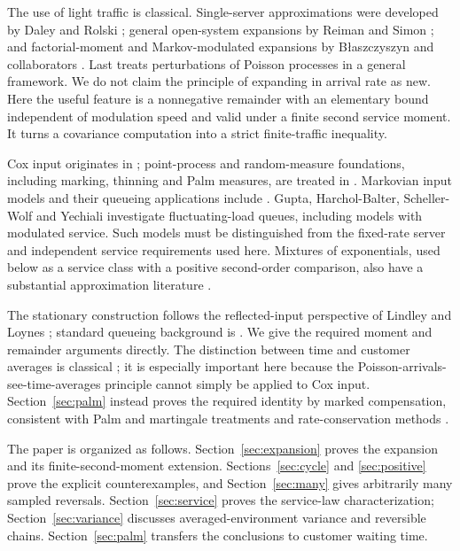 \documentclass[11pt,reqno]{amsart}
\numberwithin{equation}{section}
\theoremstyle{plain}
\theoremstyle{definition}
\newcommand{\1}{\mathbf 1}
\begin{document}
The use of light traffic is classical. Single-server approximations were developed by Daley and Rolski \cite{DR84,DR91,DR94}; general open-system expansions by Reiman and Simon \cite{RS89}; and factorial-moment and Markov-modulated expansions by B{\l}aszczyszyn and collaborators \cite{Blasz95,BFS95}. Last \cite{Last14} treats perturbations of Poisson processes in a general framework. We do not claim the principle of expanding in arrival rate as new. Here the useful feature is a nonnegative remainder with an elementary bound independent of modulation speed and valid under a finite second service moment. It turns a covariance computation into a strict finite-traffic inequality.

Cox input originates in \cite{Cox55}; point-process and random-measure foundations, including marking, thinning and Palm measures, are treated in \cite{DVJ03,DVJ08,Kallenberg17,LP18}. Markovian input models and their queueing applications include \cite{Neuts79,YN71,HL86}. Gupta, Harchol-Balter, Scheller-Wolf and Yechiali \cite{GHSY06} investigate fluctuating-load queues, including models with modulated service. Such models must be distinguished from the fixed-rate server and independent service requirements used here. Mixtures of exponentials, used below as a service class with a positive second-order comparison, also have a substantial approximation literature \cite{Whitt84}.

The stationary construction follows the reflected-input perspective of Lindley and Loynes \cite{Lindley52,Loynes62}; standard queueing background is \cite{Asmussen03}. We give the required moment and remainder arguments directly. The distinction between time and customer averages is classical \cite{Brumelle71,HS80}; it is especially important here because the Poisson-arrivals-see-time-averages principle \cite{Wolff82} cannot simply be applied to Cox input. Section~\ref{sec:palm} instead proves the required identity by marked compensation, consistent with Palm and martingale treatments \cite{Bremaud81,BB03} and rate-conservation methods \cite{Miyazawa94}.

The paper is organized as follows. Section~\ref{sec:expansion} proves the expansion and its finite-second-moment extension. Sections~\ref{sec:cycle} and \ref{sec:positive} prove the explicit counterexamples, and Section~\ref{sec:many} gives arbitrarily many sampled reversals. Section~\ref{sec:service} proves the service-law characterization; Section~\ref{sec:variance} discusses averaged-environment variance and reversible chains. Section~\ref{sec:palm} transfers the conclusions to customer waiting time.
\end{document}
